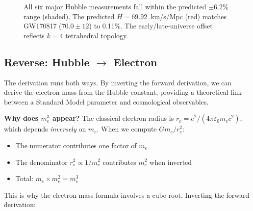 \documentclass[aps,prd,preprint,superscriptaddress,showpacs,preprintnumbers,amsmath,amssymb,nofootinbib]{revtex4-2}
\begin{document}
\begin{figure}[H]
{%
}
\vspace{0.5em}
\caption{All six major Hubble measurements fall within the predicted $\pm 6.2\%$ range (shaded). The predicted $H = 69.92$~km/s/Mpc (red) matches GW170817 ($70.0 \pm 12$) to 0.11\%. The early/late-universe offset reflects $k=4$ tetrahedral topology.}
\label{fig:measurement-cage}
\end{figure}

\vspace{1em}

\subsection{Reverse: Hubble \texorpdfstring{$\rightarrow$}{→} Electron}
\label{subsec:reverse}

The derivation runs both ways. By inverting the forward derivation, we can derive the electron mass from the Hubble constant, providing a theoretical link between a Standard Model parameter and cosmological observables.

\textbf{Why does $m_e^3$ appear?} The classical electron radius is $r_e = e^2/(4\pi\varepsilon_0 m_e c^2)$, which depends \emph{inversely} on $m_e$. When we compute $Gm_e/r_e^2$:
\begin{itemize}
\item The numerator contributes one factor of $m_e$
\item The denominator $r_e^2 \propto 1/m_e^2$ contributes $m_e^2$ when inverted
\item Total: $m_e \times m_e^2 = m_e^3$
\end{itemize}
This is why the electron mass formula involves a cube root. Inverting the forward derivation:
\end{document}
